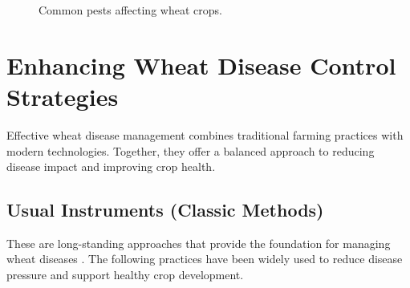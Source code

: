\begin{figure}[H]

    \caption{Common pests affecting wheat crops.}
    \label{fig:wheat-pests}
\end{figure}


\section{Enhancing Wheat Disease Control Strategies}

Effective wheat disease management combines traditional farming practices with modern technologies. Together, they offer a balanced approach to reducing disease impact and improving crop health.

\subsection{Usual Instruments (Classic Methods)}
These are long-standing approaches that provide the foundation for managing wheat diseases \parencite{mehta2014wheat}. The following practices have been widely used to reduce disease pressure and support healthy crop development.

